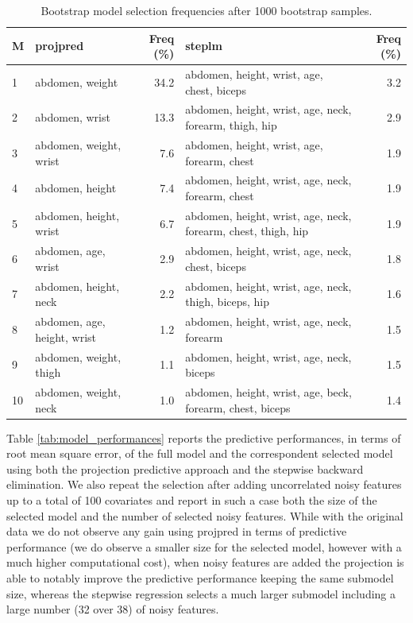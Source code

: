 \documentclass[american,]{article}
\theoremstyle{definition}
\begin{document}
\begin{table}[tp]
\scriptsize
\centering
\begin{tabular}{l||l|r||l|r}
  \hline
M & projpred & Freq (\%) & steplm & Freq (\%)  \\ 
  \hline
1 & abdomen, weight & 34.2 & abdomen, height, wrist, age, chest, biceps & 3.2 \\
2 & abdomen, wrist & 13.3 & abdomen, height, wrist, age, neck, forearm, thigh, hip & 2.9 \\
3 & abdomen, weight, wrist & 7.6 & abdomen, height, wrist, age, forearm, chest & 1.9 \\
4 & abdomen, height & 7.4 & abdomen, height, wrist, age, neck, forearm, chest & 1.9 \\
5 & abdomen, height, wrist & 6.7 & abdomen, height, wrist, age, neck, forearm, chest, thigh, hip & 1.9 \\
6 & abdomen, age, wrist & 2.9 & abdomen, height, wrist, age, neck, chest, biceps & 1.8 \\
7 & abdomen, height, neck & 2.2 & abdomen, height, wrist, age, neck, thigh, biceps, hip & 1.6 \\
8 & abdomen, age, height, wrist & 1.2 & abdomen, height, wrist, age, neck, forearm & 1.5 \\
9 & abdomen, weight, thigh & 1.1 & abdomen, height, wrist, age, neck, biceps & 1.5 \\
10 & abdomen, weight, neck & 1.0 & abdomen, height, wrist, age, beck, forearm, chest, biceps & 1.4 \\
   \hline
\end{tabular}
\caption{Bootstrap model selection frequencies after 1000 bootstrap samples.}
\label{tab:model_frequencies}
\end{table}

Table \ref{tab:model_performances} reports the predictive performances, in terms of root mean square error, of the full model and the correspondent selected model using both the projection predictive approach and the stepwise backward elimination. We also repeat the selection after adding uncorrelated noisy features up to a total of 100 covariates and report in such a case both the size of the selected model and the number of selected noisy features. While with the original data we do not observe any gain using projpred in terms of predictive performance (we do observe a smaller size for the selected model, however with a much higher computational cost), when noisy features are added the projection is able to notably improve the predictive performance keeping the same submodel size, whereas the stepwise regression selects a much larger submodel including a large number (32 over 38) of noisy features.
\end{document}
